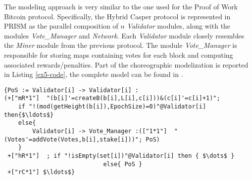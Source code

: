 The modeling approach is very similar to the one used for the Proof of Work Bitcoin protocol. Specifically, the Hybrid Casper protocol is represented in PRISM as the parallel composition of $n$ \emph{Validator} modules, along with the modules \emph{Vote\_Manager} and \emph{Network}. Each \emph{Validator} module closely resembles the \emph{Miner} module from the previous protocol. The module \emph{Vote\_Manager} is responsible for storing maps containing votes for each block and computing associated rewards/penalties.
Part of the choreographic modelization is reported in Listing \ref{ex5-code}, the complete model can be found in \cite{repository}. 
\begin{lstlisting}[style=chor-color,tabsize=2,breaklines=true, postbreak=\mbox{\textcolor{red}{$\hookrightarrow$}\space},	caption={Choreographic language for the Hybrid Casper Protocol},captionpos=b,label={ex5-code}]
{PoS := Validator[i] -> Validator[i] :
(+["mR*1"]  "(b[i]'=createB(b[i],L[i],c[i]))&(c[i]'=c[i]+1)"; 
	if "!(mod(getHeight(b[i]),EpochSize)=0)"@Validator[i] then{$\ldots$}
	else{
		Validator[i] -> Vote_Manager :(["1*1"]  "(Votes'=addVote(Votes,b[i],stake[i]))"; PoS)
	}
 +["hR*1"]  ; if "!isEmpty(set[i])"@Validator[i] then { $\dots$ }
 							else{ PoS }
 +["rC*1"] $\ldots$}

\end{lstlisting}
